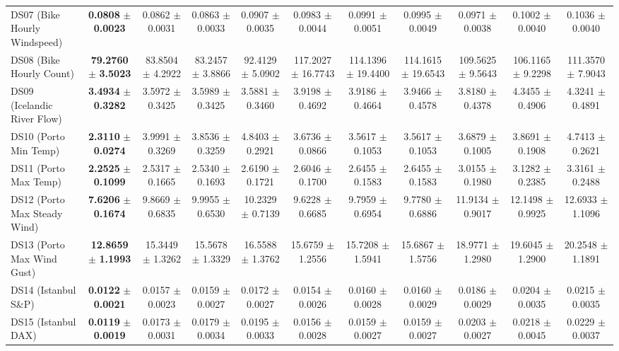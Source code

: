 \begin{table}[t]
{{\begin{tabular}{lcccccccccc}
DS07 (Bike Hourly Windspeed) & \textbf{0.0808} $\pm$ \textbf{0.0023} & 0.0862 $\pm$ 0.0031 & 0.0863 $\pm$ 0.0033 & 0.0907 $\pm$ 0.0035 & 0.0983 $\pm$ 0.0044 & 0.0991 $\pm$ 0.0051 & 0.0995 $\pm$ 0.0049 & 0.0971 $\pm$ 0.0038 & 0.1002 $\pm$ 0.0040 & 0.1036 $\pm$ 0.0040 \\
DS08 (Bike Hourly Count) & \textbf{79.2760} $\pm$ \textbf{3.5023} & 83.8504 $\pm$ 4.2922 & 83.2457 $\pm$ 3.8866 & 92.4129 $\pm$ 5.0902 & 117.2027 $\pm$ 16.7743 & 114.1396 $\pm$ 19.4400 & 114.1615 $\pm$ 19.6543 & 109.5625 $\pm$ 9.5643 & 106.1165 $\pm$ 9.2298 & 111.3570 $\pm$ 7.9043 \\
DS09 (Icelandic River Flow) & \textbf{3.4934} $\pm$ \textbf{0.3282} & 3.5972 $\pm$ 0.3425 & 3.5989 $\pm$ 0.3425 & 3.5881 $\pm$ 0.3460 & 3.9198 $\pm$ 0.4692 & 3.9186 $\pm$ 0.4664 & 3.9466 $\pm$ 0.4578 & 3.8180 $\pm$ 0.4378 & 4.3455 $\pm$ 0.4906 & 4.3241 $\pm$ 0.4891 \\
DS10 (Porto Min Temp) & \textbf{2.3110} $\pm$ \textbf{0.0274} & 3.9991 $\pm$ 0.3269 & 3.8536 $\pm$ 0.3259 & 4.8403 $\pm$ 0.2921 & 3.6736 $\pm$ 0.0866 & 3.5617 $\pm$ 0.1053 & 3.5617 $\pm$ 0.1053 & 3.6879 $\pm$ 0.1005 & 3.8691 $\pm$ 0.1908 & 4.7413 $\pm$ 0.2621 \\
DS11 (Porto Max Temp) & \textbf{2.2525} $\pm$ \textbf{0.1099} & 2.5317 $\pm$ 0.1665 & 2.5340 $\pm$ 0.1693 & 2.6190 $\pm$ 0.1721 & 2.6046 $\pm$ 0.1700 & 2.6455 $\pm$ 0.1583 & 2.6455 $\pm$ 0.1583 & 3.0155 $\pm$ 0.1980 & 3.1282 $\pm$ 0.2385 & 3.3161 $\pm$ 0.2488 \\
DS12 (Porto Max Steady Wind) & \textbf{7.6206} $\pm$ \textbf{0.1674} & 9.8669 $\pm$ 0.6835 & 9.9955 $\pm$ 0.6530 & 10.2329 $\pm$ 0.7139 & 9.6228 $\pm$ 0.6685 & 9.7959 $\pm$ 0.6954 & 9.7780 $\pm$ 0.6886 & 11.9134 $\pm$ 0.9017 & 12.1498 $\pm$ 0.9925 & 12.6933 $\pm$ 1.1096 \\
DS13 (Porto Max Wind Gust) & \textbf{12.8659} $\pm$ \textbf{1.1993} & 15.3449 $\pm$ 1.3262 & 15.5678 $\pm$ 1.3329 & 16.5588 $\pm$ 1.3762 & 15.6759 $\pm$ 1.2556 & 15.7208 $\pm$ 1.5941 & 15.6867 $\pm$ 1.5756 & 18.9771 $\pm$ 1.2980 & 19.6045 $\pm$ 1.2900 & 20.2548 $\pm$ 1.1891 \\
DS14 (Istanbul S\&P) & \textbf{0.0122} $\pm$ \textbf{0.0021} & 0.0157 $\pm$ 0.0023 & 0.0159 $\pm$ 0.0027 & 0.0172 $\pm$ 0.0027 & 0.0154 $\pm$ 0.0026 & 0.0160 $\pm$ 0.0028 & 0.0160 $\pm$ 0.0029 & 0.0186 $\pm$ 0.0029 & 0.0204 $\pm$ 0.0035 & 0.0215 $\pm$ 0.0035 \\
DS15 (Istanbul DAX) & \textbf{0.0119} $\pm$ \textbf{0.0019} & 0.0173 $\pm$ 0.0031 & 0.0179 $\pm$ 0.0034 & 0.0195 $\pm$ 0.0033 & 0.0156 $\pm$ 0.0028 & 0.0159 $\pm$ 0.0027 & 0.0159 $\pm$ 0.0027 & 0.0203 $\pm$ 0.0027 & 0.0218 $\pm$ 0.0045 & 0.0229 $\pm$ 0.0037 \\

\end{tabular}}}
\end{table}
